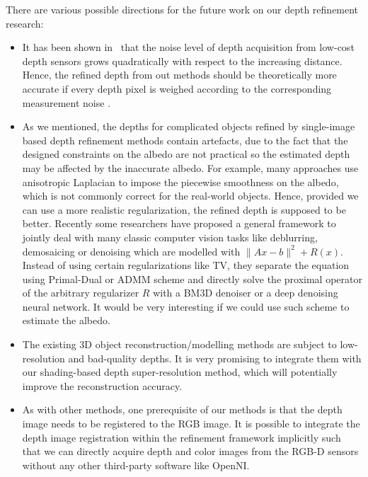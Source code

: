There are various possible directions for the future work on our depth refinement research:
\begin{itemize}
    \item It has been shown in~\cite{khoshelham2012accuracy} that the noise level of depth acquisition from low-cost depth sensors grows quadratically with respect to the increasing distance.
    Hence, the refined depth from out methods should be theoretically more accurate if every depth pixel is weighed according to the corresponding measurement noise .
    
    \item As we mentioned, the depths for complicated objects refined by single-image based depth refinement methods contain artefacts, due to the fact that the designed constraints on the albedo are not practical so the estimated depth may be affected by the inaccurate albedo.
    For example, many approaches use anisotropic Laplacian to impose the piecewise smoothness on the albedo, which is not commonly correct for the real-world objects.
    Hence, provided we can use a more realistic regularization, the refined depth is supposed to be better.
    Recently some researchers have proposed a general framework to jointly deal with many classic computer vision tasks like deblurring, demosaicing or denoising which are modelled with $\lVert Ax - b\rVert^2 + R(x)$.
    Instead of using certain regularizations like TV, they separate the equation using Primal-Dual or ADMM scheme and directly solve the proximal operator of the arbitrary regularizer $R$ with a BM3D denoiser\cite{heide2014flexisp} or a deep denoising neural network\cite{meinhardt2017learning}.
    It would be very interesting if we could use such scheme to estimate the albedo. 

    \item The existing 3D object reconstruction/modelling methods are subject to low-resolution and bad-quality depths.
             It is very promising to integrate them with our shading-based depth super-resolution method, which will potentially improve the reconstruction accuracy.   
     
    \item As with other methods, one prerequisite of our methods is that the depth image needs to be registered to the RGB image.
    It is possible to integrate the depth image registration within the refinement framework implicitly such that we can directly acquire depth and color images from the RGB-D sensors without any other third-party software like OpenNI.
             
\end{itemize}







